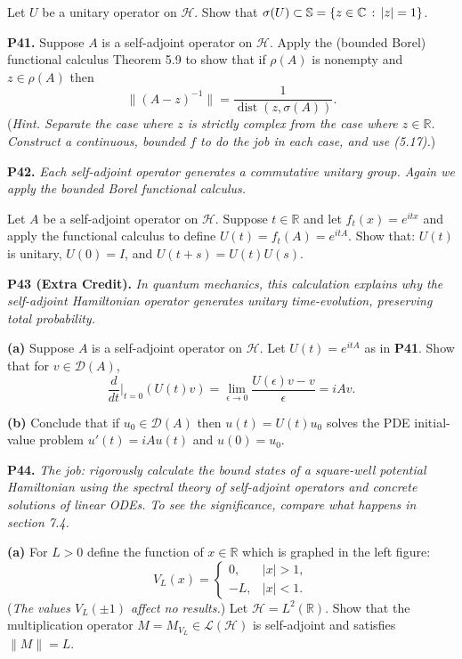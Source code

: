 \documentclass[12pt]{amsart}
\newcommand{\cD}{\mathcal{D}}
\newcommand{\cH}{\mathcal{H}}
\newcommand{\cL}{\mathcal{L}}
\newcommand{\CC}{\mathbb{C}}
\newcommand{\RR}{\mathbb{R}}
\newcommand{\eps}{\epsilon}
\newcommand{\prob}[1]{\bigskip\noindent\textbf{#1.}\quad }
\newcommand{\epart}[1]{\medskip\noindent\textbf{(#1)}\quad }
\begin{document}
\medskip\noindent Let $U$ be a unitary operator on $\cH$.  Show that $\sigma(U) \subset \SS = \{z\in\CC\,:\,|z|=1\}$.


\prob{P41}  Suppose $A$ is a self-adjoint operator on $\cH$.  Apply the (bounded Borel) functional calculus Theorem 5.9 to show that if $\rho(A)$ is nonempty and $z\in\rho(A)$ then
	$$\|(A-z)^{-1}\| = \frac{1}{\operatorname{dist}(z,\sigma(A))}.$$
(\emph{Hint. Separate the case where $z$ is strictly complex from the case where $z\in\RR$.  Construct a continuous, bounded $f$ to do the job in each case, and use (5.17).})


\clearpage\newpage
\prob{P42}  \emph{Each self-adjoint operator generates a commutative unitary group.  Again we apply the bounded Borel functional calculus.}

\medskip\noindent Let $A$ be a self-adjoint operator on $\cH$.  Suppose $t\in\RR$ and let $f_t(x) = e^{itx}$ and apply the functional calculus to define $U(t) = f_t(A) = e^{itA}$.  Show that: $U(t)$ is unitary, $U(0) = I$, and $U(t+s) = U(t) U(s)$.


\prob{P43 (Extra Credit)}  \emph{In quantum mechanics, this calculation explains why the self-adjoint Hamiltonian operator generates unitary time-evolution, preserving total probability.}

\epart{a}  Suppose $A$ is a self-adjoint operator on $\cH$.  Let $U(t) = e^{itA}$ as in \textbf{P41}.  Show that for $v\in\cD(A)$,
	$$\frac{d}{dt}\Big|_{t=0} (U(t)v) = \lim_{\eps\to 0} \frac{U(\eps)v-v}{\eps} = i A v.$$

\epart{b}  Conclude that if $u_0\in\cD(A)$ then $u(t) = U(t) u_0$ solves the PDE initial-value problem $u'(t) = iAu(t)$ and $u(0)=u_0$.


\prob{P44}  \emph{The job: rigorously calculate the bound states of a square-well potential Hamiltonian using the spectral theory of self-adjoint operators and concrete solutions of linear ODEs.  To see the significance, compare what happens in section 7.4.}

\epart{a}  For $L>0$ define the function of $x\in\RR$ which is graphed in the left figure:
	$$V_L(x) = \begin{cases} 0, & |x|>1, \\ -L, & |x|<1. \end{cases}$$
(\emph{The values $V_L(\pm 1)$ affect no results.})  Let $\cH=L^2(\RR)$.  Show that the multiplication operator $M = M_{V_L}\in\cL(\cH)$ is self-adjoint and satisfies $\|M\|=L$.
\end{document}
